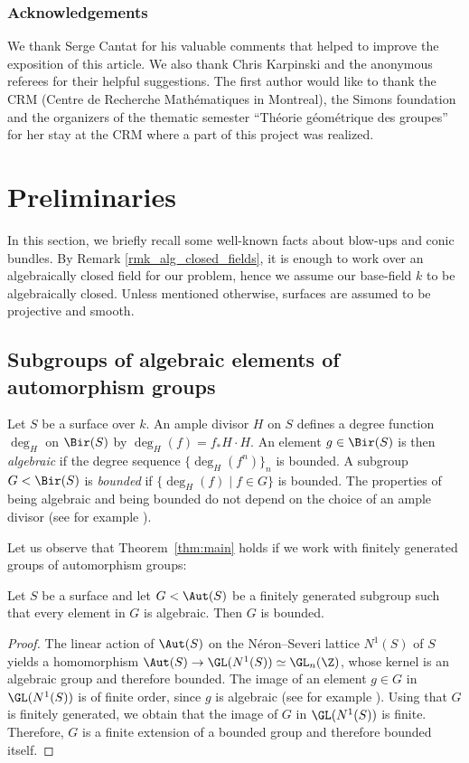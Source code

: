 \subsubsection*{Acknowledgements}
We thank Serge Cantat for his valuable comments that helped to improve the exposition of this article. {We also thank Chris Karpinski and the anonymous referees for their helpful suggestions.}
The first author would like to thank the CRM (Centre de Recherche Mathématiques in Montreal), the Simons foundation and the organizers of the thematic semester ``Théorie géométrique des groupes'' for her stay at the CRM where a part of this project was realized.

\section{Preliminaries}
In this section, we briefly recall some well-known facts about blow-ups and conic bundles. {By Remark \ref{rmk_alg_closed_fields}, it is enough to work over an algebraically closed field for our problem, hence} we assume our base-field $k$ to be algebraically closed. Unless mentioned otherwise, surfaces are assumed to be projective and smooth.

\subsection{Subgroups of algebraic elements of automorphism groups}
{Let $S$ be a surface over $k$.} An ample divisor $H$ on $S$ defines a degree function $\deg_H$ on $\Bir(S)$ by $\deg_H(f)=f_*H\cdot H$. An element $g\in \Bir(S)$ is then \emph{algebraic} if the degree sequence $\{\deg_H(f^n)\}_n$ is bounded. A subgroup $G<\Bir(S)$ is \emph{bounded} if $\{\deg_H(f)\mid f\in G\}$ is bounded. The properties of being algebraic and being bounded do not depend on the choice of an ample divisor (see for example \cite{MR4133708}).

Let us observe that Theorem~\ref{thm:main} holds if we work with finitely generated groups of automorphism groups:

\begin{lemma}\label{lem:aut}
Let $S$ be a
surface and let $G<\Aut(S)$ be a finitely generated subgroup such that every element in $G$ is algebraic. Then $G$ is bounded.
\end{lemma}

\begin{proof}
The linear action of $\Aut(S)$ on the Néron--Severi lattice $N^1(S)$ of $S$ yields a homomorphism $\Aut(S)\to\GL(N^1(S))\simeq \GL_n(\Z)$, whose kernel is an algebraic group and therefore bounded. The image of an element $g\in G$ in $\GL(N^1(S))$ is of finite order, since $g$ is algebraic (see for example \cite[Th.\,4.6]{cantat2015cremona}). Using that $G$ is finitely generated, we obtain that the image of $G$ in $\GL(N^1(S))$ is finite. Therefore, $G$ is a finite extension of a bounded group and therefore bounded itself.
\end{proof}

